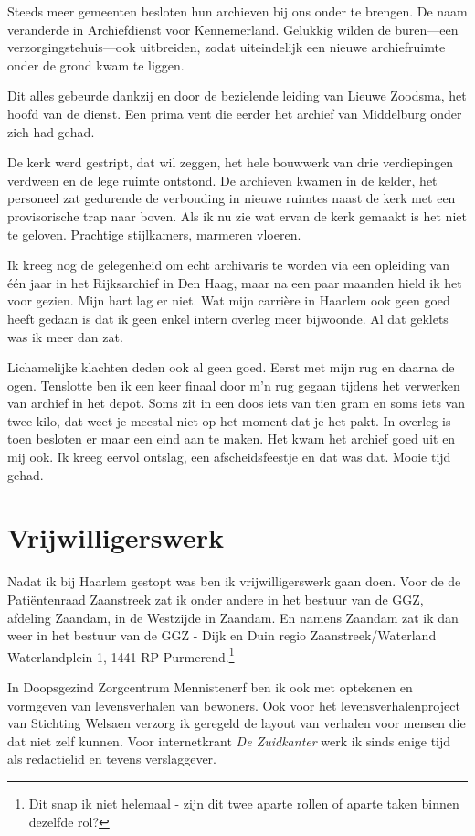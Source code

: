 \documentclass[10pt,twoside, openright]{memoir}
\begin{document}
Steeds meer gemeenten besloten hun archieven bij ons onder te brengen. De naam veranderde in Archiefdienst voor Kennemerland. Gelukkig wilden de buren---een verzorgingstehuis---ook uitbreiden, zodat uiteindelijk een nieuwe archiefruimte onder de grond kwam te liggen. 

Dit alles gebeurde dankzij en door de bezielende leiding van Lieuwe Zoodsma, het hoofd van de dienst. Een prima vent die eerder het archief van Middelburg onder zich had gehad.

De kerk werd gestript, dat wil zeggen, het hele bouwwerk van drie verdiepingen verdween en de lege ruimte ontstond. De archieven kwamen in de kelder, het personeel zat gedurende de verbouding in nieuwe ruimtes naast de kerk met een provisorische trap naar boven. Als ik nu zie wat ervan de kerk gemaakt is het niet te geloven. Prachtige stijlkamers, marmeren vloeren.

Ik kreeg nog de gelegenheid om echt archivaris te worden via een opleiding van één jaar in het Rijksarchief in Den Haag, maar na een paar maanden hield ik het voor gezien. Mijn hart lag er niet. Wat mijn carrière in Haarlem ook geen goed heeft gedaan is dat ik geen enkel intern overleg meer bijwoonde. Al dat geklets was ik meer dan zat. 

Lichamelijke klachten deden ook al geen goed. Eerst met mijn rug en daarna de ogen. Tenslotte ben ik een keer finaal door m’n rug gegaan tijdens het verwerken van archief in het depot. Soms zit in een doos iets van tien gram en soms iets van twee kilo, dat weet je meestal niet op het moment dat je het pakt. In overleg is toen besloten er maar een eind aan te maken. Het kwam het archief goed uit en mij ook. Ik kreeg eervol ontslag, een afscheidsfeestje en dat was dat. Mooie tijd gehad.

\chapter{Vrijwilligerswerk} %
\label{cha:vrijwilligerswerk}

Nadat ik bij Haarlem gestopt was ben ik vrijwilligerswerk gaan doen. Voor de de Patiëntenraad Zaanstreek zat ik onder andere in het bestuur van de GGZ, afdeling Zaandam, in de Westzijde in Zaandam. En namens Zaandam zat ik dan weer in het bestuur van de GGZ - Dijk en Duin regio Zaanstreek/Waterland Waterlandplein 1, 1441 RP Purmerend.\footnote{Dit snap ik niet helemaal - zijn dit twee aparte rollen of aparte taken binnen dezelfde rol?} 

In Doopsgezind Zorgcentrum Mennistenerf ben ik ook met optekenen en vormgeven van levensverhalen van bewoners. Ook voor het levensverhalenproject van Stichting Welsaen verzorg ik geregeld de layout van verhalen voor mensen die dat niet zelf kunnen. Voor internetkrant \emph{De Zuidkanter} werk ik sinds enige tijd als redactielid en tevens verslaggever.
\end{document}
